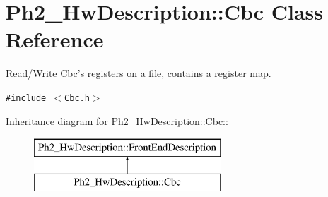 \hypertarget{class_ph2___hw_description_1_1_cbc}{
\section{Ph2\_\-Hw\-Description::Cbc Class Reference}
\label{class_ph2___hw_description_1_1_cbc}
}
Read/Write Cbc's registers on a file, contains a register map.  


{\tt \#include $<$Cbc.h$>$}

Inheritance diagram for Ph2\_\-Hw\-Description::Cbc::\begin{figure}[H]
\begin{center}
\leavevmode
\includegraphics[height=2cm]{class_ph2___hw_description_1_1_cbc}
\end{center}
\end{figure}
